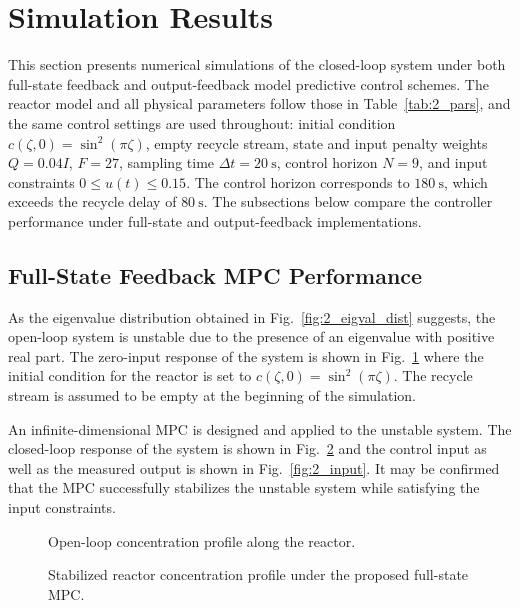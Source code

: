 \section{Simulation Results}

This section presents numerical simulations of the closed-loop system under both full-state feedback and output-feedback model predictive control schemes. The reactor model and all physical parameters follow those in Table~\ref{tab:2_pars}, and the same control settings are used throughout: initial condition $c(\zeta, 0) = \sin^2(\pi \zeta)$, empty recycle stream, state and input penalty weights $Q = 0.04 I$, $F = 27$, sampling time $\Delta t = 20~\mathrm{s}$, control horizon $N = 9$, and input constraints $0 \leq u(t) \leq 0.15$. The control horizon corresponds to $180~\mathrm{s}$, which exceeds the recycle delay of $80~\mathrm{s}$. The subsections below compare the controller performance under full-state and output-feedback implementations.

\subsection{Full-State Feedback MPC Performance}

As the eigenvalue distribution obtained in Fig.~\ref{fig:2_eigval_dist} suggests, the open-loop system is unstable due to the presence of an eigenvalue with positive real part. The zero-input response of the system is shown in Fig.~\ref{fig:2_open} where the initial condition for the reactor is set to $c(\zeta ,0) = \sin^2(\pi \zeta)$. The recycle stream is assumed to be empty at the beginning of the simulation.

An infinite-dimensional MPC is designed and applied to the unstable system. The closed-loop response of the system is shown in Fig.~\ref{fig:2_closed} and the control input as well as the measured output is shown in Fig.~\ref{fig:2_input}. It may be confirmed that the MPC successfully stabilizes the unstable system while satisfying the input constraints.

\begin{figure}[!htbp]
    \centering
    
    \caption{Open-loop concentration profile along the reactor.}
    \label{fig:2_open}
\end{figure}

\begin{figure}[!htbp]
    \centering
    
    \caption{Stabilized reactor concentration profile under the proposed full-state MPC.}
    \label{fig:2_closed}
\end{figure}

